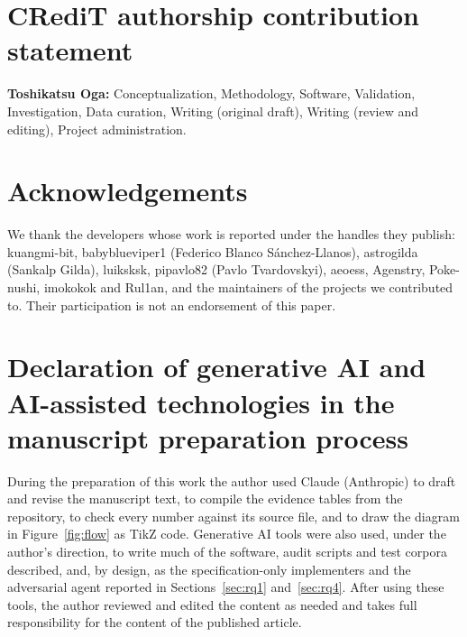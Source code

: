 \documentclass[preprint,12pt,authoryear]{elsarticle}
\begin{document}
\section*{CRediT authorship contribution statement}
\textbf{Toshikatsu Oga:} Conceptualization, Methodology, Software, Validation, Investigation, Data curation, Writing (original draft), Writing (review and editing), Project administration.

\section*{Acknowledgements}
We thank the developers whose work is reported under the handles they publish: kuangmi-bit, babyblueviper1 (Federico Blanco S\'anchez-Llanos), astrogilda (Sankalp Gilda), luiksksk, pipavlo82 (Pavlo Tvardovskyi), aeoess, Agenstry, Poke-nushi, imokokok and Rul1an, and the maintainers of the projects we contributed to. Their participation is not an endorsement of this paper.

\section*{Declaration of generative AI and AI-assisted technologies in the manuscript preparation process}
During the preparation of this work the author used Claude (Anthropic) to draft and revise the manuscript text, to compile the evidence tables from the repository, to check every number against its source file, and to draw the diagram in Figure~\ref{fig:flow} as TikZ code. Generative AI tools were also used, under the author's direction, to write much of the software, audit scripts and test corpora described, and, by design, as the specification-only implementers and the adversarial agent reported in Sections~\ref{sec:rq1} and~\ref{sec:rq4}. After using these tools, the author reviewed and edited the content as needed and takes full responsibility for the content of the published article.
\end{document}
